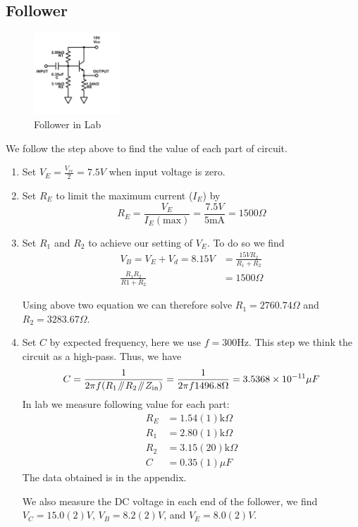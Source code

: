 \documentclass[aps,prl,reprint]{revtex4-1}
\newcommand{\vcc}{V_\text{cc}}
\newcommand{\parallelsum}{\mathbin{\!/\mkern-5mu/\!}}
\begin{document}
\subsection{Follower}
\begin{figure}[h]
    \centering
    \includegraphics[height=1.2in]{image/Follower-Full-Lab.pdf}
    \caption{Follower in Lab}
    \label{fig:followerLab}
\end{figure}
We follow the step above to find the value of each part of circuit.
\begin{enumerate}
    \item Set $V_E = \frac{\vcc}{2} = 7.5V$ when input voltage is zero.

    \item Set $R_E$ to limit the maximum current ($I_E$) by 
    \[
    R_E = \frac{V_E}{I_E(\text{max})} = \frac{7.5V}{5\text{mA}} = 1500\Omega
    \]

    \item Set $R_1$ and $R_2$ to achieve our setting of $V_E$. To do so we find 
    \begin{align*}
        V_B = V_E + V_d = 8.15V &= \frac{15V R_2}{R_1 + R_2}\\
        \frac{R_1R_2}{R1+R_2} &= 1500\Omega
    \end{align*}

    Using above two equation we can therefore solve $R_1 = 2760.74\Omega$ and $R_2=3283.67\Omega$.

    \item Set $C$ by expected frequency, here we use $f = 300$Hz. This step we think the circuit as a high-pass. Thus, we have 
    \[
    C = \frac{1}{2\pi f (R_1 \parallelsum R_2 \parallelsum Z_\text{in})} = \frac{1}{2\pi f 1496.8 \Omega}=3.5368\times 10^{-11}\mu F
    \]
    In lab we measure following value for each part:
    \begin{align*}
        R_E &= 1.54(1)\text{k}\Omega\\
        R_1 &= 2.80(1)\text{k}\Omega\\
        R_2 &= 3.15(20)\text{k}\Omega\\
        C &= 0.35(1)\mu F
    \end{align*}
    The data obtained is in the appendix.

    We also measure the DC voltage in each end of the follower, we find $V_C = 15.0(2)V$, $V_B = 8.2(2)V$, and $V_E = 8.0(2)V$.
\end{enumerate}
\end{document}
